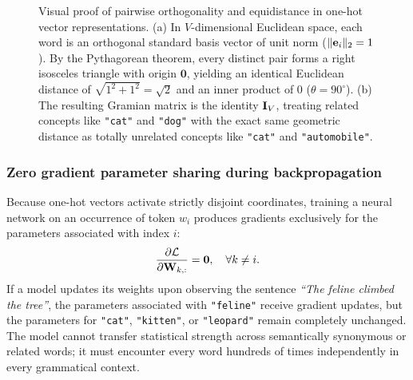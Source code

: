 \documentclass[../../main.tex]{subfiles}
\begin{document}
\begin{figure}[htbp]
\caption{Visual proof of pairwise orthogonality and equidistance in one-hot vector representations. (a) In $V$-dimensional Euclidean space, each word is an orthogonal standard basis vector of unit norm ($\|\mathbf{e}_i\|_2 = 1$). By the Pythagorean theorem, every distinct pair forms a right isosceles triangle with origin $\mathbf{0}$, yielding an identical Euclidean distance of $\sqrt{1^2 + 1^2} = \sqrt{2}$ and an inner product of $0$ ($\theta = 90^\circ$). (b) The resulting Gramian matrix is the identity $\mathbf{I}_V$, treating related concepts like \texttt{"cat"} and \texttt{"dog"} with the exact same geometric distance as totally unrelated concepts like \texttt{"cat"} and \texttt{"automobile"}.}
\label{fig:onehot_orthogonality_geometry}
\end{figure}

\subsubsection{Zero gradient parameter sharing during backpropagation}
Because one-hot vectors activate strictly disjoint coordinates, training a neural network on an occurrence of token $w_i$ produces gradients exclusively for the parameters associated with index $i$:
\begin{equation}
\label{eq:weight_update_isolation}
\frac{\partial \mathcal{L}}{\partial \mathbf{W}_{k, :}} = \mathbf{0}, \quad \forall k \neq i.
\end{equation}
If a model updates its weights upon observing the sentence \emph{``The feline climbed the tree''}, the parameters associated with \texttt{"feline"} receive gradient updates, but the parameters for \texttt{"cat"}, \texttt{"kitten"}, or \texttt{"leopard"} remain completely unchanged. The model cannot transfer statistical strength across semantically synonymous or related words; it must encounter every word hundreds of times independently in every grammatical context.
\end{document}
